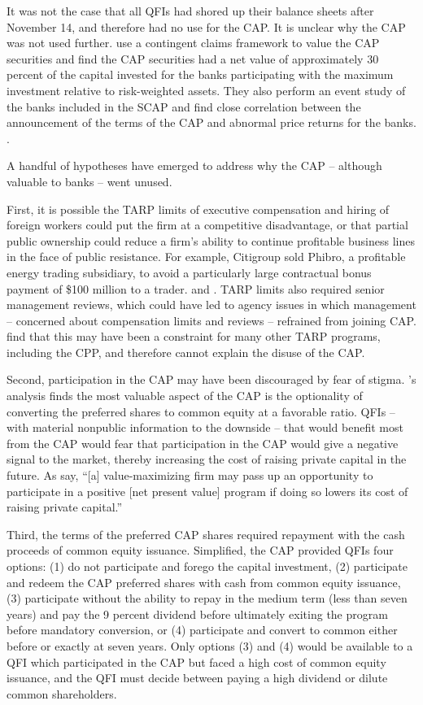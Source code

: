 \documentclass[12pt]{article}
\begin{document}
It was not the case that all QFIs had shored up their balance sheets after November 14, and therefore had no use for the CAP. It is unclear why the CAP was not used further. \citet{GW} use a contingent claims framework to value the CAP securities and find the CAP securities had a net value of approximately 30 percent of the capital invested for the banks participating with the maximum investment relative to risk-weighted assets. They also perform an event study of the banks included in the SCAP and find close correlation between the announcement of the terms of the CAP and abnormal price returns for the banks. \citep{GW}.

A handful of hypotheses have emerged to address why the CAP -- although valuable to banks -- went unused.

First, it is possible the TARP limits of executive compensation and hiring of foreign workers could put the firm at a competitive disadvantage, or that partial public ownership could reduce a firm's ability to continue profitable business lines in the face of public resistance. For example, Citigroup sold Phibro, a profitable energy trading subsidiary, to avoid a particularly large contractual bonus payment of \$100 million to a trader. \citep{GW} and \citep{Dash}. TARP limits also required senior management reviews, which could have led to agency issues in which management -- concerned about compensation limits and reviews -- refrained from joining CAP. \citet{GW} find that this may have been a constraint for many other TARP programs, including the CPP, and therefore cannot explain the disuse of the CAP.

Second, participation in the CAP may have been discouraged by fear of stigma. \citet{GW}'s analysis finds the most valuable aspect of the CAP is the optionality of converting the preferred shares to common equity at a favorable ratio. QFIs -- with material nonpublic information to the downside -- that would benefit most from the CAP would fear that participation in the CAP would give a negative signal to the market, thereby increasing the cost of raising private capital in the future. As \citet{GW} say, “[a] value-maximizing firm may pass up an opportunity to participate in a positive [net present value] program if doing so lowers its cost of raising private capital.''

Third, the terms of the preferred CAP shares required repayment with the cash proceeds of common equity issuance. Simplified, the CAP provided QFIs four options: (1) do not participate and forego the capital investment, (2) participate and redeem the CAP preferred shares with cash from common equity issuance, (3) participate without the ability to repay in the medium term (less than seven years) and pay the 9 percent dividend before ultimately exiting the program before mandatory conversion, or (4) participate and convert to common either before or exactly at seven years. Only options (3) and (4) would be available to a QFI which participated in the CAP but faced a high cost of common equity issuance, and the QFI must decide between paying a high dividend or dilute common shareholders.
\end{document}
